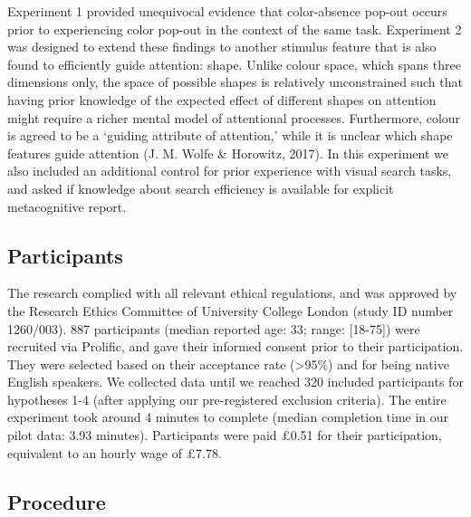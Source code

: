 \documentclass[12pt,twoside]{reedthesis}
\begin{document}
Experiment 1 provided unequivocal evidence that color-absence pop-out occurs prior to experiencing color pop-out in the context of the same task. Experiment 2 was designed to extend these findings to another stimulus feature that is also found to efficiently guide attention: shape. Unlike colour space, which spans three dimensions only, the space of possible shapes is relatively unconstrained such that having prior knowledge of the expected effect of different shapes on attention might require a richer mental model of attentional processes. Furthermore, colour is agreed to be a `guiding attribute of attention,' while it is unclear which shape features guide attention (J. M. Wolfe \& Horowitz, 2017). In this experiment we also included an additional control for prior experience with visual search tasks, and asked if knowledge about search efficiency is available for explicit metacognitive report.

\hypertarget{participants-1}{%
\subsection{Participants}\label{participants-1}}

The research complied with all relevant ethical regulations, and was approved by the Research Ethics Committee of University College London (study ID number 1260/003). 887 participants (median reported age: 33; range: {[}18-75{]}) were recruited via Prolific, and gave their informed consent prior to their participation. They were selected based on their acceptance rate (\textgreater95\%) and for being native English speakers. We collected data until we reached 320 included participants for hypotheses 1-4 (after applying our pre-registered exclusion criteria). The entire experiment took around 4 minutes to complete (median completion time in our pilot data: 3.93 minutes). Participants were paid £0.51 for their participation, equivalent to an hourly wage of £7.78.

\hypertarget{procedure-1}{%
\subsection{Procedure}\label{procedure-1}}
\end{document}
